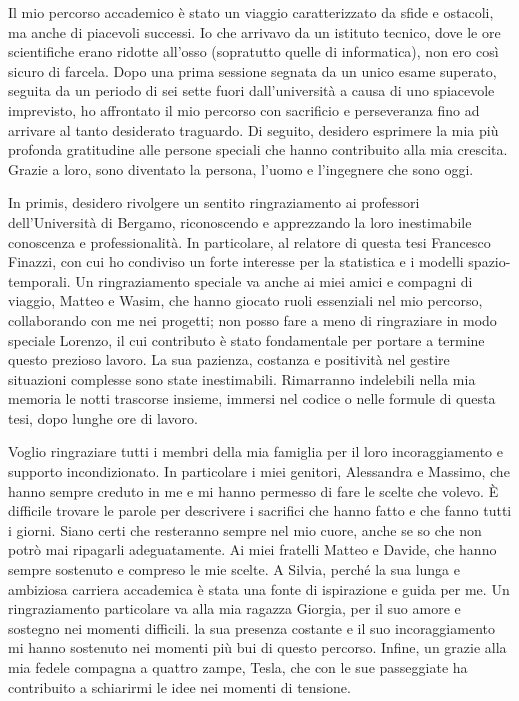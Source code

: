 
Il mio percorso accademico è stato un viaggio caratterizzato da sfide e ostacoli, ma anche di piacevoli successi. Io che arrivavo da un istituto tecnico, dove le ore scientifiche erano ridotte all'osso (sopratutto quelle di informatica), non ero così sicuro di farcela. Dopo una prima sessione segnata da un unico esame superato, seguita da un periodo di sei sette fuori dall'università a causa di uno spiacevole imprevisto, ho affrontato il mio percorso con sacrificio e perseveranza fino ad arrivare al tanto desiderato traguardo. Di seguito, desidero esprimere la mia più profonda gratitudine alle persone speciali che hanno contribuito alla mia crescita. Grazie a loro, sono diventato la persona, l'uomo e l'ingegnere che sono oggi.
\par In primis, desidero rivolgere un sentito ringraziamento ai professori dell'Università di Bergamo, riconoscendo e apprezzando la loro inestimabile conoscenza e professionalità. In particolare, al relatore di questa tesi Francesco Finazzi, con cui ho condiviso un forte interesse per la statistica e i modelli spazio-temporali. Un ringraziamento speciale va anche ai miei amici e compagni di viaggio, Matteo e Wasim, che hanno giocato ruoli essenziali nel mio percorso, collaborando con me nei progetti; non posso fare a meno di ringraziare in modo speciale Lorenzo, il cui contributo è stato fondamentale per portare a termine questo prezioso lavoro. La sua pazienza, costanza e positività nel gestire situazioni complesse sono state inestimabili. Rimarranno indelebili nella mia memoria le notti trascorse insieme, immersi nel codice o nelle formule di questa tesi, dopo lunghe ore di lavoro.
\par Voglio ringraziare tutti i membri della mia famiglia per il loro incoraggiamento e supporto incondizionato. In particolare i miei genitori, Alessandra e Massimo, che hanno sempre creduto in me e mi hanno permesso di fare le scelte che volevo. È difficile trovare le parole per descrivere i sacrifici che hanno fatto e che fanno tutti i giorni. Siano certi che resteranno sempre nel mio cuore, anche se so che non potrò mai ripagarli adeguatamente. Ai miei fratelli Matteo e Davide, che hanno sempre sostenuto e compreso le mie scelte. A Silvia, perché la sua lunga e ambiziosa carriera accademica è stata una fonte di ispirazione e guida per me.
Un ringraziamento particolare va alla mia ragazza Giorgia, per il suo amore e sostegno nei momenti difficili. la sua presenza costante e il suo incoraggiamento mi hanno sostenuto nei momenti più bui di questo percorso. Infine, un grazie alla mia fedele compagna a quattro zampe, Tesla, che con le sue passeggiate ha contribuito a schiarirmi le idee nei momenti di tensione.